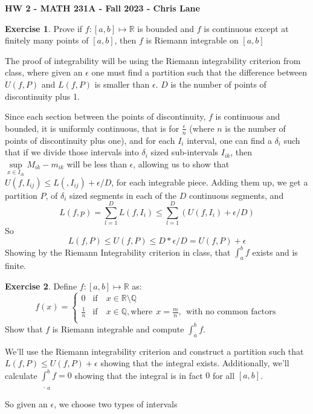 \documentclass[11pt,oneside]{article}
\numberwithin{equation}{section}
\theoremstyle{definition}
\newtheorem{exercise}{Exercise}
\def\RR{\mathbb{R}}
\def\QQ{\mathbb{Q}}
\begin{document}
\textbf{HW 2 - MATH 231A - Fall 2023 - Chris Lane}
\begin{exercise}
  Prove if $f:[a, b] \mapsto \RR $ is bounded and $f$ is continuous
  except at finitely many points of $[a,b]$, then $f$ is Riemann integrable on $[a,b ]$
\end{exercise}
\begin{solution}
  The proof of integrability will be using the Riemann integrability
  criterion from class, where given an $\epsilon$ one must find a
  partition such that the difference between $U(f, P)$ and $L(f, P)$
  is smaller than $\epsilon$. $D$ is the number of points of
  discontinuity plus 1.

  Since each section between the points of discontinuity, $f$ is
  continuous and bounded, it is uniformly continuous, that is for
  $\frac{\epsilon}{n}$ (where $n$ is the number of points of
  discontinuity plus one), and for each $I_i$ interval, one can find a
  $\delta _ i$ such that if we divide those intervals into $\delta_i$
  sized sub-intervals $I_{ik}$, then $ \sup \limits_{x \in I_{ik}}
  M_{ik} - m_{ik} $ will be less than $\epsilon$, allowing us to show
  that $U(f, I_{ij}) \leq L(, I_{ij}) + \epsilon / D$, for each
  integrable piece.  Adding them up, we get a partition $P$, of
  $\delta_{i} $ sized segments in each of the $D$ continuous segments,
  and
  $$
  L(f, p) = \sum _{l=1}^D L(f, I_i) \leq \sum _{l=1}^D ( U(f, I_i) + \epsilon / D )
  $$
  So
  $$
  L(f, P) \leq U(f, P) \leq D * \epsilon / D = U(f, P) + \epsilon
  $$
  Showing by the Riemann Integrability criterion in class, that
  $\int _ a ^ b f$ exists and is finite.
  
  
\end{solution}

\begin{exercise}
  Define $f : [a,b ] \mapsto \RR $ as:
  $$
  f(x) = \begin{cases}
    0 & \text{if} \quad x \in \RR \setminus \QQ \\
    \frac{1}{n} & \text{if} \quad x \in \QQ, \text{where}\ \  x = \frac{m}{n}, \ \ 
    \text{with no common factors} \\
  \end{cases}
  $$
  Show that $f$ is Riemann integrable and compute $\int _ {a} ^ {b} f$.  
\end{exercise}
\begin{solution}
  We'll use the Riemann integrability criterion and construct a
  partition such that $L(f, P) \leq U(f, P) + \epsilon$ showing that
  the integral exists.  Additionally, we'll
  calculate $\underline \int _{a} ^ {b} f = 0$ showing
  that the integral is in fact $0$ for all $[a,b]$.

  So given an $\epsilon$, we choose two types of intervals
  
\end{solution}
\end{document}
